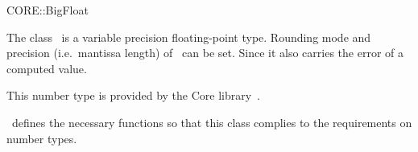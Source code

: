 \ccDefGlobalScope{}
\begin{ccRefClass}{CORE::BigFloat}

\ccDefinition

The class \ccRefName\ is a variable precision floating-point type. 
Rounding mode and precision (i.e.\ mantissa length) of 
\ccRefName\ can be set. 
Since it also carries the error of a computed value.  

This number type is provided by the {\sc Core} library~\cite{klpy-clp-99}.

\cgal\ defines the necessary functions so that this class complies to the
requirements on number types.


\ccIsModel
{}\\
\\
\\

\end{ccRefClass}
